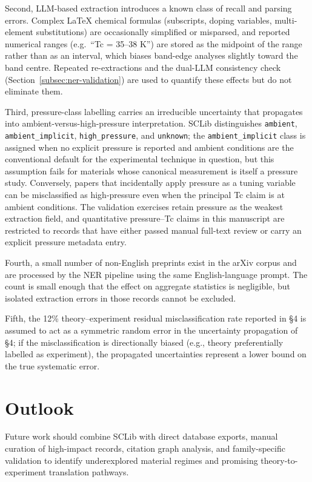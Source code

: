\documentclass[11pt]{article}
\begin{document}
Second, LLM-based extraction introduces a known class of recall and parsing errors. Complex LaTeX chemical formulas (subscripts, doping variables, multi-element substitutions) are occasionally simplified or misparsed, and reported numerical ranges (e.g.\ ``Tc = 35--38 K'') are stored as the midpoint of the range rather than as an interval, which biases band-edge analyses slightly toward the band centre. Repeated re-extractions and the dual-LLM consistency check (Section~\ref{subsec:ner-validation}) are used to quantify these effects but do not eliminate them.

Third, pressure-class labelling carries an irreducible uncertainty that propagates into ambient-versus-high-pressure interpretation. SCLib distinguishes \texttt{ambient}, \texttt{ambient\_implicit}, \texttt{high\_pressure}, and \texttt{unknown}; the \texttt{ambient\_implicit} class is assigned when no explicit pressure is reported and ambient conditions are the conventional default for the experimental technique in question, but this assumption fails for materials whose canonical measurement is itself a pressure study. Conversely, papers that incidentally apply pressure as a tuning variable can be misclassified as high-pressure even when the principal Tc claim is at ambient conditions. The validation exercises retain pressure as the weakest extraction field, and quantitative pressure--Tc claims in this manuscript are restricted to records that have either passed manual full-text review or carry an explicit pressure metadata entry.

Fourth, a small number of non-English preprints exist in the arXiv corpus and are processed by the NER pipeline using the same English-language prompt. The count is small enough that the effect on aggregate statistics is negligible, but isolated extraction errors in those records cannot be excluded.

Fifth, the 12\% theory--experiment residual misclassification rate reported in \S4 is assumed to act as a symmetric random error in the uncertainty propagation of \S4; if the misclassification is directionally biased (e.g., theory preferentially labelled as experiment), the propagated uncertainties represent a lower bound on the true systematic error.

\section{Outlook}

Future work should combine SCLib with direct database exports, manual curation of high-impact records, citation graph analysis, and family-specific validation to identify underexplored material regimes and promising theory-to-experiment translation pathways.
\end{document}
